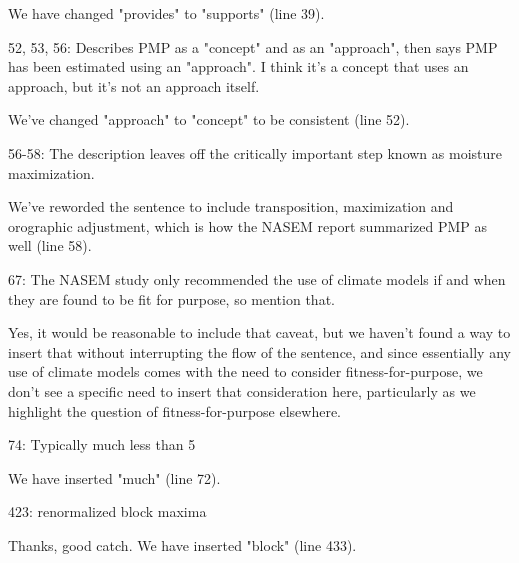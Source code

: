 \documentclass[12pt,english]{reviewresponse}
\begin{document}
\begin{revresponse}
We have changed "provides" to "supports" (line 39).

\end{revresponse}

\begin{revcomment}
52, 53, 56: Describes PMP as a "concept" and as an "approach", then says PMP has been estimated using an "approach".  I think it's a concept that uses an approach, but it's not an approach itself.
\end{revcomment}
\begin{revresponse}
We've changed "approach" to "concept" to be consistent (line 52).
\end{revresponse}

\begin{revcomment}

56-58: The description leaves off the critically important step known as moisture maximization.
\end{revcomment}
\begin{revresponse}
We've reworded the sentence to include transposition, maximization and orographic adjustment, which is how the NASEM report summarized PMP as well (line 58).     
\end{revresponse}
\begin{revcomment}

67: The NASEM study only recommended the use of climate models if and when they are found to be fit for purpose, so mention that.
\end{revcomment}
\begin{revresponse}
   Yes, it would be reasonable to include that caveat, but we haven't found a way to insert that without interrupting the flow of the sentence, and since essentially any use of climate models comes with the need to consider fitness-for-purpose, we don't see a specific need to insert that consideration here, particularly as we highlight the question of fitness-for-purpose elsewhere.
 
\end{revresponse}



\begin{revcomment}

74: Typically much less than 5%
\end{revcomment}
\begin{revresponse}
    We have inserted "much" (line 72).
\end{revresponse}

\begin{revcomment}

423: renormalized block maxima
\end{revcomment}

\begin{revresponse}
 Thanks, good catch. We have inserted "block" (line 433).
\end{revresponse}
\end{document}
